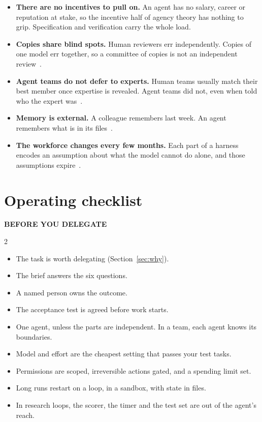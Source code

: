 \documentclass[11pt,letterpaper]{article}
\newcommand{\boxlabel}[1]{{\sffamily\footnotesize\bfseries\color{ink2} #1}}
\begin{document}
\begin{itemize}
  \item \textbf{There are no incentives to pull on.} An agent has no salary, career or
        reputation at stake, so the incentive half of agency theory has nothing to grip.
        Specification and verification carry the whole load.
  \item \textbf{Copies share blind spots.} Human reviewers err independently. Copies of one
        model err together, so a committee of copies is not an independent
        review~\cite{cais}.
  \item \textbf{Agent teams do not defer to experts.} Human teams usually match their best
        member once expertise is revealed. Agent teams did not, even when told who the
        expert was~\cite{pappu}.
  \item \textbf{Memory is external.} A colleague remembers last week. An agent remembers what
        is in its files~\cite{longrun}.
  \item \textbf{The workforce changes every few months.} Each part of a harness encodes an
        assumption about what the model cannot do alone, and those assumptions
        expire~\cite{harness}.
\end{itemize}

\section{Operating checklist}\label{sec:checklist}

\boxlabel{BEFORE YOU DELEGATE}
\vspace{-0.4em}
\begin{multicols}{2}\raggedright
\begin{itemize}[label=$\square$, leftmargin=1.5em, itemsep=0.25em]
  \item The task is worth delegating (Section~\ref{sec:why}).
  \item The brief answers the six questions.
  \item A named person owns the outcome.
  \item The acceptance test is agreed before work starts.
  \item One agent, unless the parts are independent. In a team, each agent knows its
        boundaries.
  \item Model and effort are the cheapest setting that passes your test tasks.
  \item Permissions are scoped, irreversible actions gated, and a spending limit set.
  \item Long runs restart on a loop, in a sandbox, with state in files.
  \item In research loops, the scorer, the timer and the test set are out of the agent's
        reach.
\end{itemize}
\end{multicols}
\end{document}
